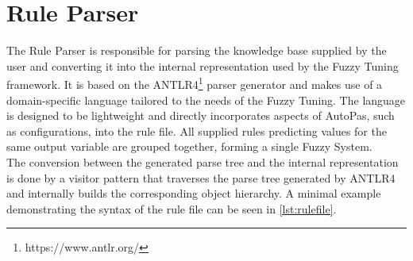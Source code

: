 \section{Rule Parser}

The Rule Parser is responsible for parsing the knowledge base supplied by the user and converting it into the internal representation used by the Fuzzy Tuning framework. It is based on the ANTLR4\footnote{https://www.antlr.org/} parser generator and makes use of a domain-specific language tailored to the needs of the Fuzzy Tuning. The language is designed to be lightweight and directly incorporates aspects of AutoPas, such as configurations, into the rule file. All supplied rules predicting values for the same output variable are grouped together, forming a single Fuzzy System. \\
The conversion between the generated parse tree and the internal representation is done by a visitor pattern that traverses the parse tree generated by ANTLR4 and internally builds the corresponding object hierarchy.
A minimal example demonstrating the syntax of the rule file can be seen in \autoref{lst:rulefile}.

